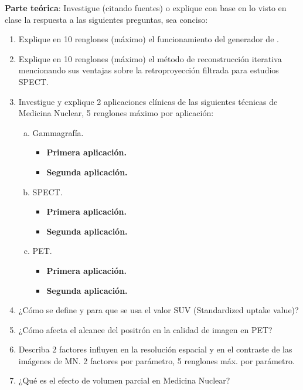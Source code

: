 \newlength{\strutheight}
\settoheight{\strutheight}{\strut}


\textbf{Parte teórica}: Investigue (citando fuentes) o explique con base en lo visto en clase la respuesta a las siguientes preguntas, sea conciso:

\begin{enumerate}[1.]
  \item Explique en 10 renglones (máximo) el funcionamiento del generador de .
  \item Explique en 10 renglones (máximo) el método de reconstrucción iterativa mencionando sus ventajas sobre la retroproyección filtrada para estudios SPECT.
  \item Investigue y explique 2 aplicaciones clínicas de las siguientes técnicas de Medicina Nuclear, 5   renglones máximo por aplicación:
  \begin{enumerate}[a.]
    \item Gammagrafía.
    \begin{itemize}
      \item \textbf{Primera aplicación.}
      \item \textbf{Segunda aplicación.}
    \end{itemize}
    \item SPECT.
    \begin{itemize}
      \item \textbf{Primera aplicación.}
      \item \textbf{Segunda aplicación.}
    \end{itemize}
    \item PET.
    \begin{itemize}
      \item \textbf{Primera aplicación.}
      \item \textbf{Segunda aplicación.}
    \end{itemize}
  \end{enumerate}
  \item ¿Cómo se define y para que se usa el valor SUV (Standardized uptake value)?
  \item ¿Cómo afecta el alcance del positrón en la calidad de imagen en PET?
  \item Describa 2 factores influyen en la resolución espacial y en el contraste de las imágenes de MN. 2 factores por parámetro, 5 renglones máx. por parámetro.
  \item ¿Qué es el efecto de volumen parcial en Medicina Nuclear?

\end{enumerate}



